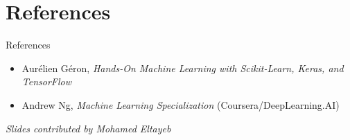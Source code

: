 \section{References}


\begin{frame}{References}
    \begin{itemize}
        \item Aurélien Géron, \textit{Hands-On Machine Learning with Scikit-Learn, Keras, and TensorFlow}
        \item Andrew Ng, \textit{Machine Learning Specialization} (Coursera/DeepLearning.AI)
    \end{itemize}

    \vspace{2em}
    
    \begin{flushleft}
        \small\textit{Slides contributed by Mohamed Eltayeb}
    \end{flushleft}
    
\end{frame}

